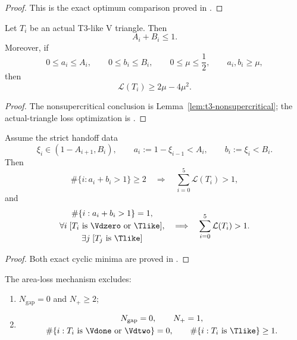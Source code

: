 \begin{proof}
This is the exact optimum comparison proved in
.
\end{proof}

\begin{theorem}
\label{thm:t3-direct-loss}
Let $T_i$ be an actual T3-like V triangle.  Then
\begin{equation}
 A_i+B_i\le1.
 \label{eq:t3-area-nonsupercritical}
\end{equation}
Moreover, if
\[
 0\le a_i\le A_i,
 \qquad
 0\le b_i\le B_i,
 \qquad
 0\le\mu\le\frac12,
 \qquad
 a_i,b_i\ge\mu,
\]
then
\begin{equation}
 \mathcal L(T_i)\ge2\mu-4\mu^2.
 \label{eq:t3-loss}
\end{equation}
\end{theorem}

\begin{proof}
The nonsupercritical conclusion is Lemma~\ref{lem:t3-nonsupercritical}; the
actual-triangle loss optimization is
.
\end{proof}

\begin{lemma}
\label{lem:cyclic-area-loss}
Assume the strict handoff data
\[
 \xi_i\in(1-A_{i+1},B_i),
 \qquad
 a_i:=1-\xi_{i-1}<A_i,
 \qquad
 b_i:=\xi_i<B_i.
\]
Then
\[
 \#\{i:a_i+b_i>1\}\ge2
 \quad\Longrightarrow\quad
 \sum_{i=0}^5\mathcal L(T_i)>1,
\]
and
\[
 \begin{gathered}
 \#\{i:a_i+b_i>1\}=1,\\
 \forall i\;[T_i\text{ is }\Vdzero\text{ or }\Tlike],\\
 \exists j\;[T_j\text{ is }\Tlike]
 \end{gathered}
 \quad\Longrightarrow\quad
 \sum_{i=0}^5\mathcal L(T_i)>1.
\]
\end{lemma}

\begin{proof}
Both exact cyclic minima are proved in
.
\end{proof}

\begin{proposition}
\label{prop:area-branches}
The area-loss mechanism excludes:
\begin{enumerate}
\item $N_{\mathrm{gap}}=0$ and $N_+\ge2$;
\item
      \[
       \begin{gathered}
       N_{\mathrm{gap}}=0,\qquad N_+=1,\\
       \#\{i:T_i\text{ is }\Vdone\text{ or }\Vdtwo\}=0,\qquad
       \#\{i:T_i\text{ is }\Tlike\}\ge1.
       \end{gathered}
      \]
\end{enumerate}
\end{proposition}

